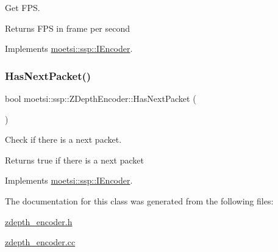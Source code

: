 Get F\+PS. 

\begin{DoxyReturn}{Returns}
F\+PS in frame per second 
\end{DoxyReturn}


Implements \hyperlink{classmoetsi_1_1ssp_1_1IEncoder_ae6a865aa52230d81aed1cb5232402f6c}{moetsi\+::ssp\+::\+I\+Encoder}.

\mbox{\label{classmoetsi_1_1ssp_1_1ZDepthEncoder_ac11aa1369150c2aa5ffa1d70d4e6ad5d}} 
\subsubsection{\texorpdfstring{Has\+Next\+Packet()}{HasNextPacket()}}
{\footnotesize\ttfamily bool moetsi\+::ssp\+::\+Z\+Depth\+Encoder\+::\+Has\+Next\+Packet (\begin{DoxyParamCaption}{ }\end{DoxyParamCaption})\hspace{0.3cm}{\ttfamily [virtual]}}



Check if there is a next packet. 

\begin{DoxyReturn}{Returns}
true if there is a next packet 
\end{DoxyReturn}


Implements \hyperlink{classmoetsi_1_1ssp_1_1IEncoder_a2af8e23d841ef61f6ee4037e56a3694d}{moetsi\+::ssp\+::\+I\+Encoder}.



The documentation for this class was generated from the following files\+:\begin{DoxyCompactItemize}
\item 
\hyperlink{zdepth__encoder_8h}{zdepth\+\_\+encoder.\+h}\item 
\hyperlink{zdepth__encoder_8cc}{zdepth\+\_\+encoder.\+cc}\end{DoxyCompactItemize}
